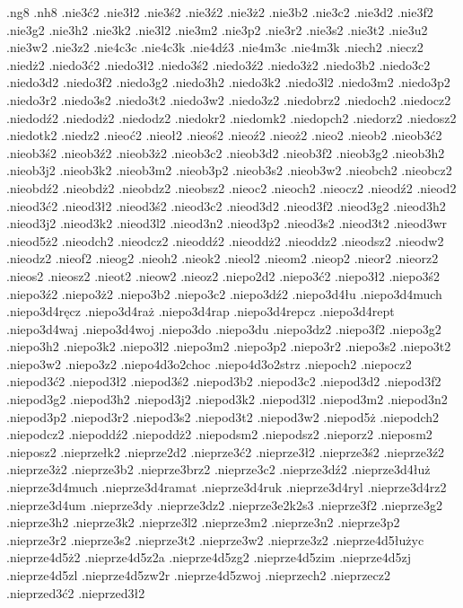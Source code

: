 {.ng8
.nh8
.nie3ć2
.nie3ł2
.nie3ś2
.nie3ź2
.nie3ż2
.nie3b2
.nie3c2
.nie3d2
.nie3f2
.nie3g2
.nie3h2
.nie3k2
.nie3l2
.nie3m2
.nie3p2
.nie3r2
.nie3s2
.nie3t2
.nie3u2
.nie3w2
.nie3z2
.nie4c3c
.nie4c3k
.nie4dź3
.nie4m3c
.nie4m3k
.niech2
.niecz2
.niedż2
.niedo3ć2
.niedo3ł2
.niedo3ś2
.niedo3ź2
.niedo3ż2
.niedo3b2
.niedo3c2
.niedo3d2
.niedo3f2
.niedo3g2
.niedo3h2
.niedo3k2
.niedo3l2
.niedo3m2
.niedo3p2
.niedo3r2
.niedo3s2
.niedo3t2
.niedo3w2
.niedo3z2
.niedobrz2
.niedoch2
.niedocz2
.niedodź2
.niedodż2
.niedodz2
.niedokr2
.niedomk2
.niedopch2
.niedorz2
.niedosz2
.niedotk2
.niedz2
.nieoć2
.nieoł2
.nieoś2
.nieoź2
.nieoż2
.nieo2
.nieob2
.nieob3ć2
.nieob3ś2
.nieob3ź2
.nieob3ż2
.nieob3c2
.nieob3d2
.nieob3f2
.nieob3g2
.nieob3h2
.nieob3j2
.nieob3k2
.nieob3m2
.nieob3p2
.nieob3s2
.nieob3w2
.nieobch2
.nieobcz2
.nieobdź2
.nieobdż2
.nieobdz2
.nieobsz2
.nieoc2
.nieoch2
.nieocz2
.nieodź2
.nieod2
.nieod3ć2
.nieod3ł2
.nieod3ś2
.nieod3c2
.nieod3d2
.nieod3f2
.nieod3g2
.nieod3h2
.nieod3j2
.nieod3k2
.nieod3l2
.nieod3n2
.nieod3p2
.nieod3s2
.nieod3t2
.nieod3wr
.nieod5ż2
.nieodch2
.nieodcz2
.nieoddź2
.nieoddż2
.nieoddz2
.nieodsz2
.nieodw2
.nieodz2
.nieof2
.nieog2
.nieoh2
.nieok2
.nieol2
.nieom2
.nieop2
.nieor2
.nieorz2
.nieos2
.nieosz2
.nieot2
.nieow2
.nieoz2
.niepo2d2
.niepo3ć2
.niepo3ł2
.niepo3ś2
.niepo3ź2
.niepo3ż2
.niepo3b2
.niepo3c2
.niepo3dź2
.niepo3d4łu
.niepo3d4much
.niepo3d4ręcz
.niepo3d4raż
.niepo3d4rap
.niepo3d4repcz
.niepo3d4rept
.niepo3d4waj
.niepo3d4woj
.niepo3do
.niepo3du
.niepo3dz2
.niepo3f2
.niepo3g2
.niepo3h2
.niepo3k2
.niepo3l2
.niepo3m2
.niepo3p2
.niepo3r2
.niepo3s2
.niepo3t2
.niepo3w2
.niepo3z2
.niepo4d3o2choc
.niepo4d3o2strz
.niepoch2
.niepocz2
.niepod3ć2
.niepod3ł2
.niepod3ś2
.niepod3b2
.niepod3c2
.niepod3d2
.niepod3f2
.niepod3g2
.niepod3h2
.niepod3j2
.niepod3k2
.niepod3l2
.niepod3m2
.niepod3n2
.niepod3p2
.niepod3r2
.niepod3s2
.niepod3t2
.niepod3w2
.niepod5ż
.niepodch2
.niepodcz2
.niepoddź2
.niepoddż2
.niepodsm2
.niepodsz2
.nieporz2
.nieposm2
.nieposz2
.nieprzełk2
.nieprze2d2
.nieprze3ć2
.nieprze3ł2
.nieprze3ś2
.nieprze3ź2
.nieprze3ż2
.nieprze3b2
.nieprze3brz2
.nieprze3c2
.nieprze3dź2
.nieprze3d4łuż
.nieprze3d4much
.nieprze3d4ramat
.nieprze3d4ruk
.nieprze3d4ryl
.nieprze3d4rz2
.nieprze3d4um
.nieprze3dy
.nieprze3dz2
.nieprze3e2k2s3
.nieprze3f2
.nieprze3g2
.nieprze3h2
.nieprze3k2
.nieprze3l2
.nieprze3m2
.nieprze3n2
.nieprze3p2
.nieprze3r2
.nieprze3s2
.nieprze3t2
.nieprze3w2
.nieprze3z2
.nieprze4d5łużyc
.nieprze4d5ż2
.nieprze4d5z2a
.nieprze4d5zg2
.nieprze4d5zim
.nieprze4d5zj
.nieprze4d5zl
.nieprze4d5zw2r
.nieprze4d5zwoj
.nieprzech2
.nieprzecz2
.nieprzed3ć2
.nieprzed3ł2
}
